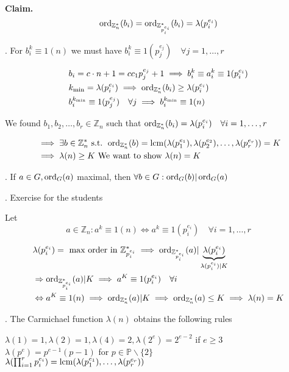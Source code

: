 \textbf{Claim.}
\[
  \operatorname{ord}_{\mathbb{Z}_n^{*}}(b_i) = \operatorname{ord}_{\mathbb{Z}_{p_i^{e_i}}^{*}} (b_i) = \lambda(p_i^{e_i})
\]

\Proof.
For $b_i^k \equiv 1 (n)$ we must have $b_i^k \equiv 1 (p_j^{e_j}) \quad \forall j = 1, \ldots, r$

\begin{align*}
  &b_i = c\cdot n+1 = c c_1 p_j^{e_j} +1 \implies b_i^k \equiv a_i^k \equiv 1 (p_i ^{e_i}) \\
  &k_{\min} = \lambda(p_i^{e_i}) \implies \operatorname{ord}_{\mathbb{Z}_n^{*}}(b_i) \geq \lambda(p_i^{e_i}) \\
  &b_i^{k_{\min}} \equiv 1 (p_j^{e_j}) \quad \forall j \implies b_i^{k_{\min}} \equiv 1 (n)
\end{align*}

We found $b_1, b_2, \ldots, b_r \in \mathbb{Z}_n$ such that $\operatorname{ord}_{\mathbb{Z}_n^{*}}(b_i) = \lambda(p_i^{e_i}) \quad \forall i = 1, \ldots, r$

\begin{align*}
  &\implies \exists b \in \mathbb{Z}_n^{*} \text{ s.t. } \operatorname{ord}_{\mathbb{Z}_n^{*}}(b) = \operatorname{lcm}(\lambda(p_1^{e_1}), \lambda(p_2^{e_2}), \ldots, \lambda(p_r^{e_r})) = K \\
  &\implies \lambda(n) \geq K \text{ We want to show $\lambda(n) = K$}
\end{align*}

\Theorem.
If $ a\in G, \operatorname{ord}_G(a)$ maximal, then $\forall b \in G: \operatorname{ord}_G(b) | \operatorname{ord}_G(a)$

\Proof.
Exercise for the students

Let
\[
  a\in \mathbb{Z}_n: a^k \equiv 1 (n) \Leftrightarrow a^k \equiv 1 (p_i^{e_i}) \quad \forall i = 1,\ldots, r
\]

\begin{align*}
  &\lambda(p_i^{e_i}) = \text{ max order in } \mathbb{Z}_{p_i^{e_i}}^{*} \implies \operatorname{ord}_{\mathbb{Z}_{p_i^{e_i}}^{*}}(a) | \underbrace{\lambda(p_i^{e_i})}_{\lambda(p_i^{e_i}) | K}\\
  &\Rightarrow \operatorname{ord}_{\mathbb{Z}_{p_i^{e_i}}^{*}}(a) | K \implies a^K \equiv 1 (p_i^{e_i}) \quad \forall i \\
  &\Leftrightarrow a^K \equiv 1 (n) \implies \operatorname{ord}_{\mathbb{Z}_{n}^{*}}(a) | K \implies  \operatorname{ord}_{\mathbb{Z}_n^{*}}(a) \leq K \implies \lambda(n) = K
\end{align*}

\Theorem.
The Carmichael function $\lambda(n)$ obtains the following rules

$\lambda(1) = 1, \lambda(2) = 1, \lambda(4) = 2, \lambda(2^e) = 2^{e-2} $ if $e \geq 3$\\
$\lambda(p^e) = p^{e-1}(p-1)$ for $p\in \mathbb{P} \backslash\{2\}$\\
$\lambda(\prod_{i=1}^{r} p_i^{e_i}) = \operatorname{lcm}(\lambda(p_1^{e_1}), \ldots, \lambda(p_r^{e_r}))$

